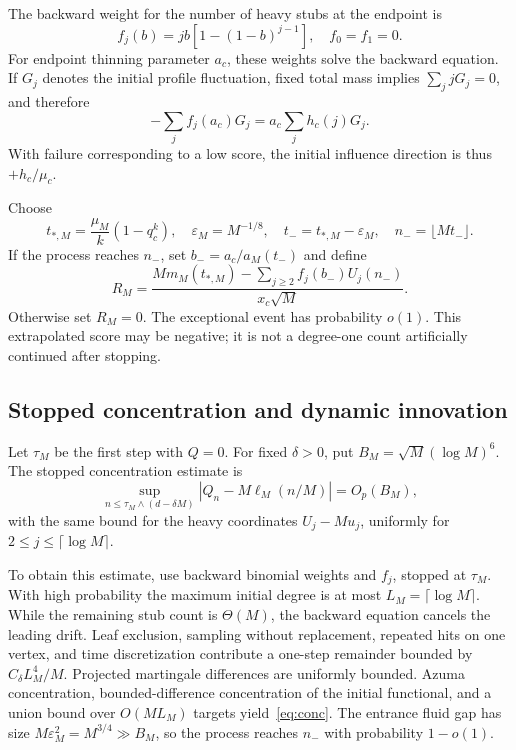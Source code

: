 \documentclass[11pt,a4paper]{article}
\begin{document}
The backward weight for the number of heavy stubs at the endpoint is
\begin{equation}
f_j(b)=jb[1-(1-b)^{j-1}],\quad f_0=f_1=0.
\end{equation}
For endpoint thinning parameter $a_c$, these weights solve the backward equation. If $G_j$ denotes the initial profile fluctuation, fixed total mass implies $\sum_jjG_j=0$, and therefore
\begin{equation}
-\sum_j f_j(a_c)G_j=a_c\sum_jh_c(j)G_j.
\end{equation}
With failure corresponding to a low score, the initial influence direction is thus $+h_c/\mu_c$.

Choose
\begin{equation}
t_{*,M}=\frac{\mu_M}{k}(1-q_c^k),\quad
\varepsilon_M=M^{-1/8},\quad t_-=t_{*,M}-\varepsilon_M,\quad
n_-=\lfloor Mt_-\rfloor.
\end{equation}
If the process reaches $n_-$, set $b_-=a_c/a_M(t_-)$ and define
\begin{equation}
R_M=\frac{M m_M(t_{*,M})-\sum_{j\ge2}f_j(b_-)U_j(n_-)}{x_c\sqrt M}.\label{eq:score}
\end{equation}
Otherwise set $R_M=0$. The exceptional event has probability $o(1)$. This extrapolated score may be negative; it is not a degree-one count artificially continued after stopping.

\subsection{Stopped concentration and dynamic innovation}
Let $\tau_M$ be the first step with $Q=0$. For fixed $\delta>0$, put
$B_M=\sqrt M(\log M)^6$. The stopped concentration estimate is
\begin{equation}
\sup_{n\le\tau_M\wedge(d-\delta M)}|Q_n-M\ell_M(n/M)|=O_p(B_M),\label{eq:conc}
\end{equation}
with the same bound for the heavy coordinates $U_j-Mu_j$, uniformly for $2\le j\le\lceil\log M\rceil$.

To obtain this estimate, use backward binomial weights and $f_j$, stopped at $\tau_M$. With high probability the maximum initial degree is at most $L_M=\lceil\log M\rceil$. While the remaining stub count is $\Theta(M)$, the backward equation cancels the leading drift. Leaf exclusion, sampling without replacement, repeated hits on one vertex, and time discretization contribute a one-step remainder bounded by $C_\delta L_M^4/M$. Projected martingale differences are uniformly bounded. Azuma concentration, bounded-difference concentration of the initial functional, and a union bound over $O(ML_M)$ targets yield~\eqref{eq:conc}. The entrance fluid gap has size $M\varepsilon_M^2=M^{3/4}\gg B_M$, so the process reaches $n_-$ with probability $1-o(1)$.
\end{document}

